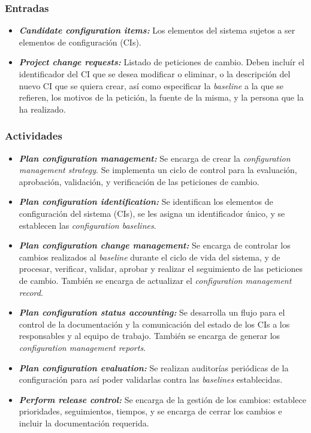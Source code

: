 \subsubsection{Entradas}
\begin{itemize}
  \item \textbf{\textit{Candidate configuration items:}} Los elementos del sistema sujetos a ser elementos de configuración (CIs).
  \item \textbf{\textit{Project change requests:}} Listado de peticiones de cambio. Deben incluír el identificador del CI que se desea modificar o eliminar, o la descripción del nuevo CI que se quiera crear, así como especificar la \textit{baseline} a la que se refieren, los motivos de la petición, la fuente de la misma, y la persona que la ha realizado.
\end{itemize}

\subsubsection{Actividades}
\begin{itemize}
  \item \textbf{\textit{Plan configuration management:}} Se encarga de crear la \textit{configuration management strategy}. Se implementa un ciclo de control para la evaluación, aprobación, validación, y verificación de las peticiones de cambio.
  \item \textbf{\textit{Plan configuration identification:}} Se identifican los elementos de configuración del sistema (CIs), se les asigna un identificador único, y se establecen las \textit{configuration baselines}.
  \item \textbf{\textit{Plan configuration change management:}} Se encarga de controlar los cambios realizados al \textit{baseline} durante el ciclo de vida del sistema, y de procesar, verificar, validar, aprobar y realizar el seguimiento de las peticiones de cambio. También se encarga de actualizar el \textit{configuration management record}.
  \item \textbf{\textit{Plan configuration status accounting:}} Se desarrolla un flujo para el control de la documentación y la comunicación del estado de los CIs a los responsables y al equipo de trabajo. También se encarga de generar los \textit{configuration management reports}.
  \item \textbf{\textit{Plan configuration evaluation:}} Se realizan auditorías periódicas de la configuración para así poder validarlas contra las \textit{baselines} establecidas.
  \item \textbf{\textit{Perform release control:}} Se encarga de la gestión de los cambios: establece prioridades, seguimientos, tiempos, y se encarga de cerrar los cambios e incluir la documentación requerida.
\end{itemize}


